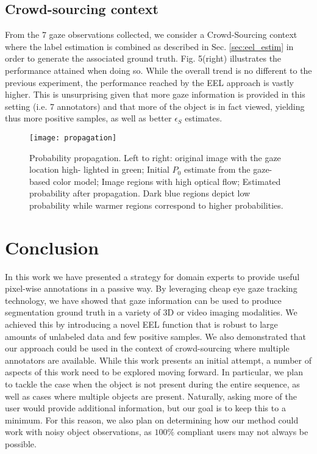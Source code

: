 \subsection{Crowd-sourcing context}
From the 7 gaze observations collected, we consider a Crowd-Sourcing context where the label estimation is combined as described in Sec. \ref{sec:eel_estim} in order to generate the associated ground truth.
Fig. 5(right) illustrates the performance attained when doing so.
While the overall trend is no different to the previous experiment, the performance reached by the EEL approach is vastly higher.
This is unsurprising given that more gaze information is provided in this setting (i.e. 7 annotators) and that more of the object is in fact
viewed, yielding thus more positive samples, as well as better $\epsilon_{S}$ estimates.

\begin{figure}
\texttt{[image: propagation]}
\caption{Probability propagation. Left to right: original image with the gaze location high-
lighted in green; Initial $P_{0}$ estimate from the gaze-based color model; Image regions with high
optical flow; Estimated probability after propagation. Dark blue regions depict low probability
while warmer regions correspond to higher probabilities.}
\label{fig:eel_propagation}
\end{figure}

\section{Conclusion}
In this work we have presented a strategy for domain experts to provide useful pixel-wise
annotations in a passive way. By leveraging cheap eye gaze tracking technology, we have showed
that gaze information can be used to produce segmentation ground truth in a variety of 3D
or video imaging modalities. We achieved this by introducing a novel EEL function that is
robust to large amounts of unlabeled data and few positive samples. We also demonstrated
that our approach could be used in the context of crowd-sourcing where multiple annotators
are available.
While this work presents an initial attempt, a number of aspects of this work need to
be explored moving forward. In particular, we plan to tackle the case when the object is not
present during the entire sequence, as well as cases where multiple objects are present. Naturally,
asking more of the user would provide additional information, but our goal is to keep this to a
minimum. For this reason, we also plan on determining how our method could work with noisy
object observations, as $100\%$ compliant users may not always be possible.
